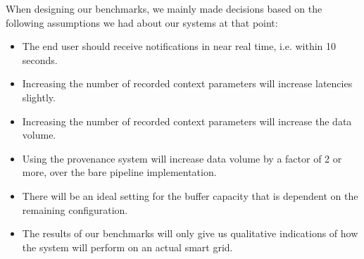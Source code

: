 \vspace{3mm}

When designing our benchmarks, we mainly made decisions based on the following assumptions we had about our systems at that point: 

\begin{itemize}
  \item The end user should receive notifications in near real time, i.e. within 10 seconds.
  \item Increasing the number of recorded context parameters will increase latencies slightly.
  \item Increasing the number of recorded context parameters will increase the data volume.
  \item Using the provenance system will increase data volume by a factor of 2 or more, over the bare pipeline implementation.
  \item There will be an ideal setting for the buffer capacity that is dependent on the remaining configuration.
  \item The results of our benchmarks will only give us qualitative indications of how the system will perform on an actual smart grid.
\end{itemize}
